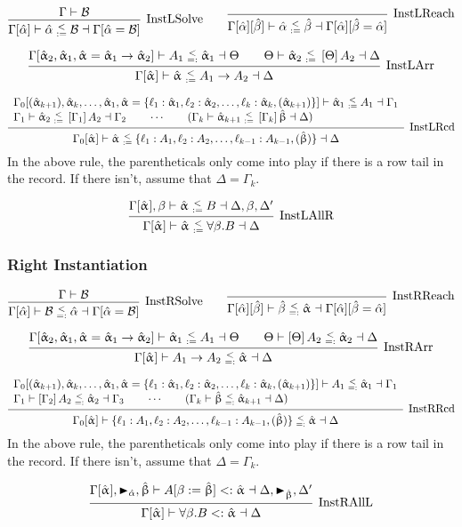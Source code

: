 \documentclass{article}
\newcommand{\spc}{\qquad}
\newcommand{\lbl}{\ell}
\newcommand{\marker}[1]{\RHD_{#1}}
\newcommand{\ev}{\hat}
\newcommand{\evar}[1][]{\ev \upalpha_{#1}}
\newcommand{\evaralt}{\ev \upbeta}
\newcommand{\ctxinout}[3]{#1 \vdash #2 \dashv #3}
\newcommand{\subsume}{<:}
\newcommand{\subsumes}[4]{\ctxinout {#1} {#2 \subsume #3} {#4}}
\newcommand{\B}{\mathcal{B}}
\newcommand{\instLSymbol}{\;\substack{<\\:=}\;}
\newcommand{\instRSymbol}{\;\substack{<\\=:}\;}
\newcommand{\apply}[1]{\left[#1\right]}
\newcommand{\instL}[4]{#1 \vdash #2 \instLSymbol #3 \dashv #4}
\newcommand{\instR}[4]{#1 \vdash #2 \instRSymbol #3 \dashv #4}
\newcommand{\deduct}[3][]
{
  \begin{prooftree}
    \hypo{#2}
    \infer1[\text{#1}]{#3}
  \end{prooftree}
}
\begin{document}
\[
  \deduct[InstLSolve]
  {\Gamma \vdash \B}
  {\instL{\Gamma[\ev\alpha]}{\ev \alpha}{\B}{\Gamma[\ev\alpha = \B]}}
  \spc
  \deduct[InstLReach]
  {}
  {\instL{\Gamma[\ev\alpha][\ev\beta]}{\ev \alpha}{\ev
      \beta}{\Gamma[\ev\alpha][\ev\beta = \ev\alpha]}}
\]

\[
  \deduct[InstLArr] {\instR{\Gamma[\evar[2], \evar[1], \evar = \evar[1] \to
      \evar[2]]}{A_1}{\evar[1]}{\Theta} \spc \instL{\Theta}{\evar[2]}{\apply \Theta
      A_2}{\Delta} } {\instL{\Gamma[\evar]}{\evar}{A_1 \to A_2}{\Delta}}
\]

\[
  \deduct[InstLRcd]
  {
    \begin{array}{l}
     \instL{\Gamma_0[(\evar[k+1]), \evar[k], \dots, \evar[1], \evar=\{\lbl_1 : \evar[1],
      \lbl_2 : \evar[2], \dots, \lbl_k : \evar[k], (\evar[k+1])\}]}{\evar[1]}{A_1}{\Gamma_1} \\
    \instL{\Gamma_1}{\evar[2]}{\apply{\Gamma_1} A_2}{\Gamma_2} \spc \cdots \spc
     (\instL{\Gamma_k}{\evar[k+1]}{\apply{\Gamma_k}\evaralt}{\Delta})
  \end{array}
  }
  {\instL{\Gamma_0[\evar]}{\evar}{\{\lbl_1:A_1, \lbl_2 : A_2, \dots, \lbl_{k-1} : A_{k-1}, (\evaralt)\}}{\Delta}}
\]
In the above rule, the parentheticals only come into play if there is a row tail
in the record. If there isn't, assume that \(\Delta = \Gamma_k\).

\[
  \deduct[InstLAllR]
  { \instL{\Gamma[\evar], \beta}{\evar}{B}{\Delta, \beta, \Delta'} }
  { \instL{\Gamma[\evar]}{\evar}{\forall \beta. B}{\Delta} }
\]

\subsubsection{Right Instantiation}

\[
  \deduct[InstRSolve]
  {\Gamma \vdash \B}
  {\instR{\Gamma[\ev\alpha]}{\B}{\ev \alpha}{\Gamma[\ev\alpha = \B]}}
  \spc
  \deduct[InstRReach]
  {}
  {\instR{\Gamma[\ev\alpha][\ev\beta]}{\ev
      \beta}{\evar}{\Gamma[\ev\alpha][\ev\beta = \ev\alpha]}}
\]

\[
  \deduct[InstRArr] {\instL{\Gamma[\evar[2], \evar[1], \evar = \evar[1] \to
      \evar[2]]}{\evar[1]}{A_1}{\Theta} \spc \instR{\Theta}{\apply \Theta
      A_2}{\evar[2]}{\Delta} } {\instR{\Gamma[\evar]}{A_1 \to A_2}{\evar}{\Delta}}
\]

\[
  \deduct[InstRRcd]
  {
    \begin{array}{l}
     \instR{\Gamma_0[(\evar[k+1]), \evar[k], \dots, \evar[1], \evar=\{\lbl_1 : \evar[1],
      \lbl_2 : \evar[2], \dots, \lbl_k : \evar[k], (\evar[k+1])\}]}{A_1}{\evar[1]}{\Gamma_1} \\
    \instR{\Gamma_1}{\apply{\Gamma_2} A_2}{\evar[2]}{\Gamma_3} \spc \cdots \spc
     (\instR{\Gamma_k}{\evaralt}{\evar[k+1]}{\Delta})
  \end{array}
  }
  {\instR{\Gamma_0[\evar]}{\{\lbl_1:A_1, \lbl_2 : A_2, \dots, \lbl_{k-1} : A_{k-1}, (\evaralt)\}}{\evar}{\Delta}}
\]
In the above rule, the parentheticals only come into play if there is a row tail
in the record. If there isn't, assume that \(\Delta = \Gamma_k\).

\[
  \deduct[InstRAllL]
  { \subsumes{\Gamma[\evar], \marker{\ev\alpha}, \evaralt}{A[\beta := \evaralt]}{\evar}{\Delta, \marker{\evaralt}, \Delta'} }
  { \subsumes{\Gamma[\evar]}{\forall \beta. B}{\evar}{\Delta} }
\]
\end{document}
